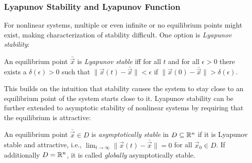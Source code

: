 			\subsubsection{Lyapunov Stability and Lyapunov Function}
				For nonlinear systems, multiple or even infinite or no equilibrium points might exist, making characterization of stability difficult. One option is \emph{Lyapunov stability}:
				\begin{definition}
					An equilibrium point \(\bar{\vec{x}}\) is \emph{Lyapunov stable} iff for all \(t\) and  for all \(\epsilon > 0\) there exists a \(\delta(\epsilon) > 0\) such that \( \lVert \vec{x}(t) - \bar{\vec{x}} \rVert < \epsilon \) if \( \lVert \vec{x}(0) - \bar{\vec{x}} \rVert > \delta(\epsilon) \).
				\end{definition}

				This builds on the intuition that stability causes the system to stay close to an equilibrium point of the system starts close to it. Lyapunov stability can be further extended to asymptotic stability of nonlinear systems by requiring that the equilibrium is attractive:
				\begin{definition}
					An equilibrium point \(\bar{\vec{x}} \in D\) is \emph{asymptotically stable} in \( D \subseteq \mathbb{R}^n \) if it is Lyapunov stable and attractive, i.e., \( \lim_{t \to \infty} \lVert \vec{x}(t) - \bar{\vec{x}} \rVert = 0 \) for all \( \vec{x}_0 \in D \). If additionally \( D = \mathbb{R}^n \), it is called \emph{globally} asymptotically stable.
				\end{definition}

